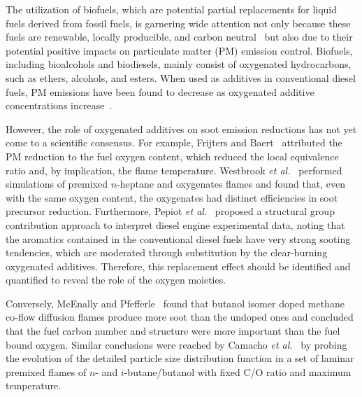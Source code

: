\documentclass[review,3p,times]{elsarticleUS}
\begin{document}
The utilization of biofuels, which are potential partial replacements for liquid fuels derived from fossil fuels, is garnering wide attention not only because these fuels are renewable, locally producible, and carbon neutral~\cite{liu11} but also due to their potential positive impacts on particulate matter (PM) emission control. Biofuels, including bioalcohols and biodiesels, mainly consist of oxygenated hydrocarbons, such as ethers, alcohols, and esters. When used as additives in conventional diesel fuels, PM emissions have been found to decrease as oxygenated additive concentrations increase~\cite{graboski98}. 

However, the role of oxygenated additives on soot emission reductions has not yet come to a scientific consensus. For example, Frijters and Baert~\cite{frijters06} attributed the PM reduction to the fuel oxygen content, which reduced the local equivalence ratio and, by implication, the flame temperature. Westbrook \emph{et al.}~\cite{westbrook06} performed simulations of premixed $n$-heptane and oxygenates flames and found that, even with the same oxygen content, the oxygenates had distinct efficiencies in soot precursor reduction. Furthermore, Pepiot \emph{et al.}~\cite{pepiot08} proposed a structural group contribution approach to interpret diesel engine experimental data, noting that the aromatics contained in the conventional diesel fuels have very strong sooting tendencies, which are moderated through substitution by the clear-burning oxygenated additives. Therefore, this replacement effect should be identified and quantified to reveal the role of the oxygen moieties. 

Conversely, McEnally and Pfefferle~\cite{mcenally05,mcenally11} found that butanol isomer doped methane co-flow diffusion flames produce more soot than the undoped ones and concluded that the fuel carbon number and structure were more important than the fuel bound oxygen. Similar conclusions were reached by Camacho \emph{et al.}~\cite{camacho13} by probing the evolution of the detailed particle size distribution function in a set of laminar premixed flames of $n$- and $i$-butane/butanol with fixed C/O ratio and maximum temperature. 
\end{document}

